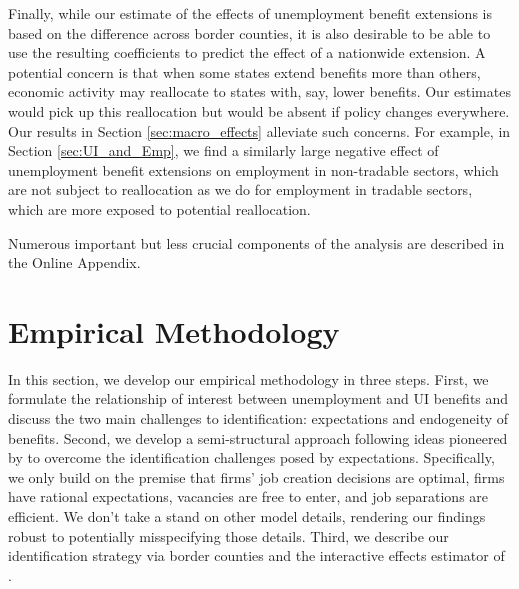 \documentclass[12pt]{article}
\newcommand{\1}{\mathbf{1}}
\begin{document}
Finally, while our estimate of the effects of unemployment benefit extensions is based on the difference across border counties, it is also desirable to be able to use the resulting coefficients to predict the effect of a nationwide extension. A potential concern is that when some states extend benefits more than others, economic activity may reallocate to states with, say, lower benefits. Our estimates would pick up this reallocation but would be absent if policy changes everywhere. Our results in Section \ref{sec:macro_effects} \citetext{and the formal analysis of aggregation in this setting in \citealp{hagedorn+manovskii+mitman:15}} alleviate such concerns. For example, in Section \ref{sec:UI_and_Emp}, we find a similarly large negative effect of unemployment benefit extensions on employment in non-tradable sectors, which are not subject to reallocation as we do for employment in tradable sectors, which are more exposed to potential reallocation. 

Numerous important but less crucial components of the analysis are described in the Online Appendix.

\section{Empirical Methodology}
\label{sec:methodology}

In this section, we develop our empirical methodology in three steps. First, we formulate the relationship of interest between unemployment and UI benefits and discuss the two main challenges to identification: expectations and endogeneity of benefits. Second, we develop a semi-structural approach following ideas pioneered by \cite{hansen_singelton:82} to overcome the identification challenges posed by expectations. Specifically, we only build on the premise that firms' job creation decisions are optimal, firms have rational expectations, vacancies are free to enter, and job separations are efficient. We don't take a stand on other model details, rendering our findings robust to potentially misspecifying those details. 
Third, we describe our identification strategy via border counties and the interactive effects estimator of \citet{bai:09}.
\end{document}
